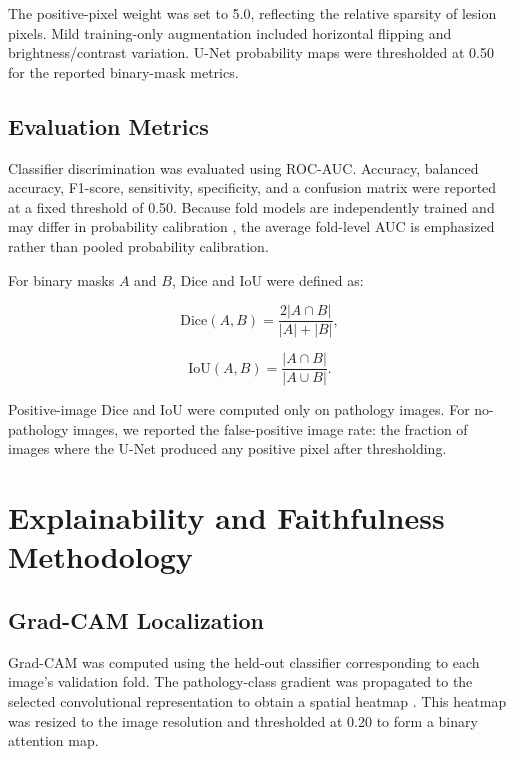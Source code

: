 The positive-pixel weight was set to 5.0, reflecting the relative sparsity of lesion pixels. Mild training-only augmentation included horizontal flipping and brightness/contrast variation. U-Net probability maps were thresholded at 0.50 for the reported binary-mask metrics.

\subsection{Evaluation Metrics}

Classifier discrimination was evaluated using ROC-AUC. Accuracy, balanced accuracy, F1-score, sensitivity, specificity, and a confusion matrix were reported at a fixed threshold of 0.50. Because fold models are independently trained and may differ in probability calibration \cite{guo2017calibration}, the average fold-level AUC is emphasized rather than pooled probability calibration.

For binary masks $A$ and $B$, Dice and IoU were defined as:

\begin{equation}
\mathrm{Dice}(A,B)=\frac{2|A\cap B|}{|A|+|B|},
\end{equation}

\begin{equation}
\mathrm{IoU}(A,B)=\frac{|A\cap B|}{|A\cup B|}.
\end{equation}

Positive-image Dice and IoU were computed only on pathology images. For no-pathology images, we reported the false-positive image rate: the fraction of images where the U-Net produced any positive pixel after thresholding.

\section{Explainability and Faithfulness Methodology}

\subsection{Grad-CAM Localization}

Grad-CAM was computed using the held-out classifier corresponding to each image's validation fold. The pathology-class gradient was propagated to the selected convolutional representation to obtain a spatial heatmap \cite{selvaraju2017gradcam}. This heatmap was resized to the image resolution and thresholded at 0.20 to form a binary attention map.

